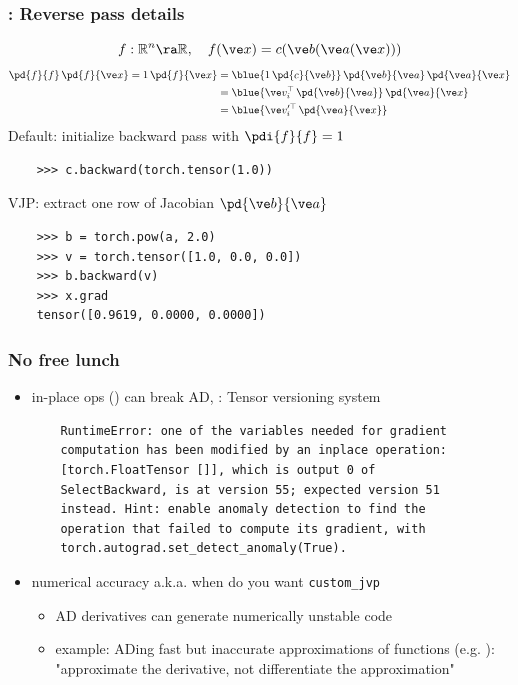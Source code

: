 \documentclass[fleqn,10pt]{beamer}
\begin{document}
\begin{frame}[fragile]
    \frametitle{\pytorch: Reverse pass details}
    \begin{equation*}
        f: \mathbb R^n\ra \mathbb R, \quad f(\ve x) = c(\ve b(\ve a(\ve x)))
    \end{equation*}
    \begin{align*}
        \pd{f}{f}\,\pd{f}{\ve x} = 1\,\pd{f}{\ve x}
            &= \blue{1\,\pd{c}{\ve b}}\,\pd{\ve b}{\ve a}\,\pd{\ve a}{\ve x}\\
            &= \blue{\ve v_i^\top\,\pd{\ve b}{\ve a}}\,\pd{\ve a}{\ve x}\\
            &= \blue{\ve v_i'^\top\,\pd{\ve a}{\ve x}}
    \end{align*}
    Default: initialize backward pass with $\pdi{f}{f}=1$
    \begin{verbatim}
    >>> c.backward(torch.tensor(1.0))
    \end{verbatim}
    VJP: extract one row of Jacobian $\pd{\ve b}{\ve a}$
    \begin{verbatim}
    >>> b = torch.pow(a, 2.0)
    >>> v = torch.tensor([1.0, 0.0, 0.0])
    >>> b.backward(v)
    >>> x.grad
    tensor([0.9619, 0.0000, 0.0000])
    \end{verbatim}
\end{frame}

\begin{frame}[fragile]
    \frametitle{No free lunch}
    \begin{itemize}
        \item in-place ops () can break AD, \pytorch: Tensor versioning system
        \begin{verbatim}
    RuntimeError: one of the variables needed for gradient
    computation has been modified by an inplace operation:
    [torch.FloatTensor []], which is output 0 of
    SelectBackward, is at version 55; expected version 51
    instead. Hint: enable anomaly detection to find the
    operation that failed to compute its gradient, with
    torch.autograd.set_detect_anomaly(True).
        \end{verbatim}
        \item numerical accuracy a.k.a. when do you want \verb|custom_jvp|
        \begin{itemize}
            \item AD derivatives can generate numerically unstable code
            \item example: ADing fast but inaccurate approximations of functions (e.g. ): "approximate the derivative, not differentiate
                the approximation"
        \end{itemize}
    \end{itemize}
\end{frame}


\begin{frame}
    \nocite{*}
    \printbibliography
\end{frame}
\end{document}
